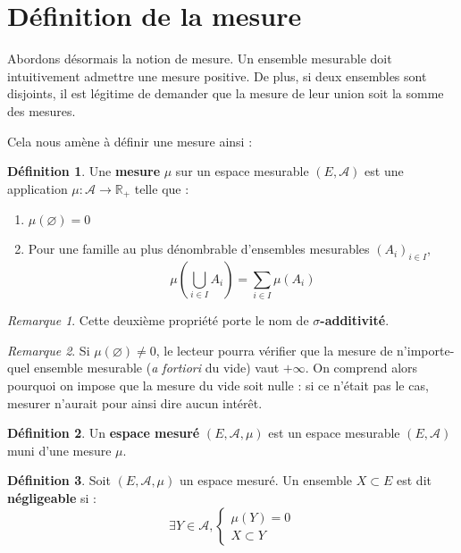 \documentclass[french]{report}
\theoremstyle{plain}
\theoremstyle{definition}
\newtheorem{defi}{Définition}[section]
\theoremstyle{remark}
\newtheorem{rem}{Remarque}[section]
\begin{document}
\section{Définition de la mesure}

Abordons désormais la notion de mesure.
Un ensemble mesurable doit intuitivement admettre une mesure positive.
De plus, si deux ensembles sont disjoints, il est légitime de demander que la mesure de leur union soit la somme des mesures.

Cela nous amène à définir une mesure ainsi :

\begin{defi}
  Une \textbf{mesure} $\mu$ sur un espace mesurable $(E, \mathcal{A})$ est une application $\mu : \mathcal{A} \longrightarrow \mathbb{R}_+$ telle que :
  \begin{enumerate}
    \item $\mu(\varnothing) = 0$
    \item Pour une famille au plus dénombrable d'ensembles mesurables $\left(A_i\right)_{i \in I}$,
    $$\mu\left(\bigcup_{i \in I}A_i\right) = \sum_{i \in I} \mu\left(A_i\right)$$
  \end{enumerate}
\end{defi}

\begin{rem}
  Cette deuxième propriété porte le nom de $\sigma$\textbf{-additivité}.
\end{rem}

\begin{rem}
  Si $\mu(\varnothing) \neq 0$, le lecteur pourra vérifier que la mesure de n'importe-quel ensemble mesurable (\textit{a fortiori} du vide) vaut $+\infty$.
  On comprend alors pourquoi on impose que la mesure du vide soit nulle : si ce n'était pas le cas, mesurer n'aurait pour ainsi dire aucun intérêt.
\end{rem}

\begin{defi}
  Un \textbf{espace mesuré} $\left(E, \mathcal{A}, \mu\right)$ est un espace mesurable $\left(E, \mathcal{A}\right)$ muni d'une mesure $\mu$.
\end{defi}

\begin{defi}
  Soit $\left(E, \mathcal{A}, \mu\right)$ un espace mesuré.
  Un ensemble $X \subset E$ est dit \textbf{négligeable} si :
  $$\exists Y \in \mathcal{A}, 
  \left\{
    \begin{array}{c}
      \mu(Y)=0\\
      X \subset Y
    \end{array}
    \right.$$
\end{defi}
\end{document}
